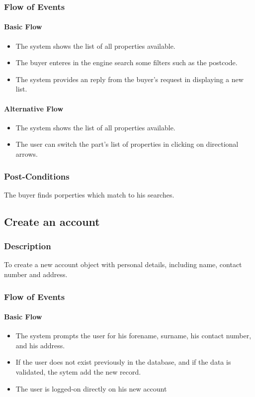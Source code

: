 \documentclass[a4paper,12pt]{article}
\begin{document}
\subsubsection{Flow of Events}
\paragraph{Basic Flow}
\begin{itemize}
\item The system shows the list of all properties available.
\item The buyer enteres in the engine search some filters such as the postcode.
\item The system provides an reply from the buyer's request in displaying a new list.
\end{itemize}
\paragraph{Alternative Flow}
\begin{itemize}
\item The system shows the list of all properties available.
\item The user can switch the part's list of properties in clicking on directional arrows.
\end{itemize}
\subsubsection{Post-Conditions}
The buyer finds porperties which match to his searches.

\subsection{Create an account}
\subsubsection{Description}
To create a new account object with personal details, including name, contact number and address.
\subsubsection{Flow of Events}
\paragraph{Basic Flow}
\begin{itemize}
\item The system prompts the user for his forename, surname, his contact number, and his address.
\item If the user does not exist previously in the database, and if the data is validated, the sytem add the new record.
\item The user is logged-on directly on his new account
\end{itemize}
\end{document}
